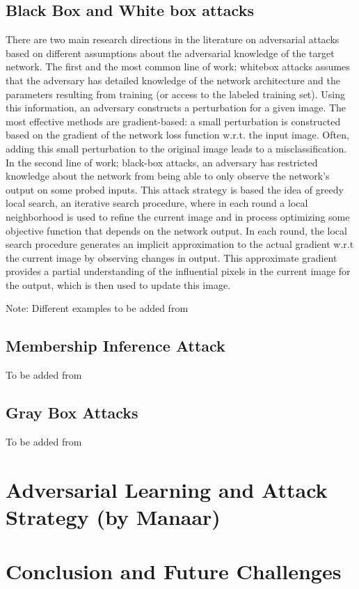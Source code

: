 \documentclass[a4paper]{article}
\newcommand{\ach}[1]{{\color{red}#1}}
\begin{document}
\subsection{Black Box and White box attacks}
There are two main research directions in the literature on adversarial attacks based on different assumptions about the adversarial knowledge of the target network. The first and the most common line of work; whitebox attacks assumes that the adversary has detailed knowledge of the network architecture and the parameters resulting from training (or access to the labeled training set). Using this information, an adversary constructs a perturbation for a given image. The most effective methods are gradient-based: a small perturbation is constructed based on the gradient of the network loss function w.r.t. the input image. Often, adding this small perturbation to the original image leads to a misclassification. In the second line of work; black-box attacks, an adversary has restricted knowledge about the network from being able to only observe the network’s output on some probed inputs. This attack strategy is based the idea of greedy local search, an iterative search procedure, where in each round a local neighborhood is used to refine the current image and in process optimizing some objective function that depends on the network output. In each round, the local search procedure generates an implicit approximation to the actual gradient w.r.t the current image by observing changes in output. This approximate gradient provides a partial understanding of the influential pixels in the current image for the output, which is then used to update this image.

\ach{Note: Different examples to be added from \cite{rosenberg2017generic}}

\subsection{Membership Inference Attack}
\ach{To be added from \cite{shokri2017membership}}

\subsection{Gray Box Attacks}
\ach{To be added from \cite{moosavi2016deepfool}}

\section{Adversarial Learning and Attack Strategy (by Manaar)}

\section{Conclusion and Future Challenges}



\end{document}
